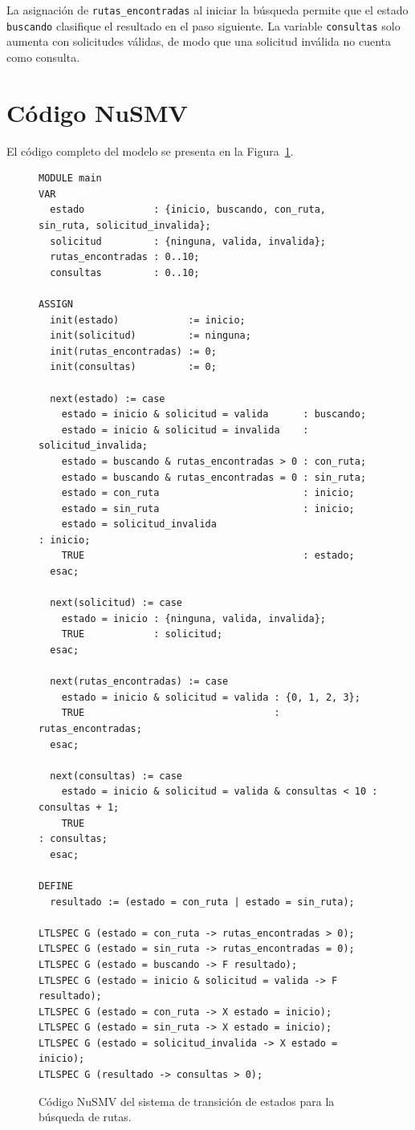 \documentclass[11pt,a4paper]{article}
\begin{document}
La asignación de \texttt{rutas\_encontradas} al iniciar la búsqueda permite que el estado \texttt{buscando} clasifique el resultado en el paso siguiente. La variable \texttt{consultas} solo aumenta con solicitudes válidas, de modo que una solicitud inválida no cuenta como consulta.

\section{Código NuSMV}

El código completo del modelo se presenta en la Figura~\ref{fig:codigo-rutas}.

\begin{figure}[H]
\centering
\begin{lstlisting}[basicstyle=\ttfamily\footnotesize]
MODULE main
VAR
  estado            : {inicio, buscando, con_ruta, sin_ruta, solicitud_invalida};
  solicitud         : {ninguna, valida, invalida};
  rutas_encontradas : 0..10;
  consultas         : 0..10;

ASSIGN
  init(estado)            := inicio;
  init(solicitud)         := ninguna;
  init(rutas_encontradas) := 0;
  init(consultas)         := 0;

  next(estado) := case
    estado = inicio & solicitud = valida      : buscando;
    estado = inicio & solicitud = invalida    : solicitud_invalida;
    estado = buscando & rutas_encontradas > 0 : con_ruta;
    estado = buscando & rutas_encontradas = 0 : sin_ruta;
    estado = con_ruta                         : inicio;
    estado = sin_ruta                         : inicio;
    estado = solicitud_invalida                            : inicio;
    TRUE                                      : estado;
  esac;

  next(solicitud) := case
    estado = inicio : {ninguna, valida, invalida};
    TRUE            : solicitud;
  esac;

  next(rutas_encontradas) := case
    estado = inicio & solicitud = valida : {0, 1, 2, 3};
    TRUE                                 : rutas_encontradas;
  esac;

  next(consultas) := case
    estado = inicio & solicitud = valida & consultas < 10 : consultas + 1;
    TRUE                                                   : consultas;
  esac;

DEFINE
  resultado := (estado = con_ruta | estado = sin_ruta);

LTLSPEC G (estado = con_ruta -> rutas_encontradas > 0);
LTLSPEC G (estado = sin_ruta -> rutas_encontradas = 0);
LTLSPEC G (estado = buscando -> F resultado);
LTLSPEC G (estado = inicio & solicitud = valida -> F resultado);
LTLSPEC G (estado = con_ruta -> X estado = inicio);
LTLSPEC G (estado = sin_ruta -> X estado = inicio);
LTLSPEC G (estado = solicitud_invalida -> X estado = inicio);
LTLSPEC G (resultado -> consultas > 0);
\end{lstlisting}
\caption{Código NuSMV del sistema de transición de estados para la búsqueda de rutas.}
\label{fig:codigo-rutas}
\end{figure}
\end{document}
